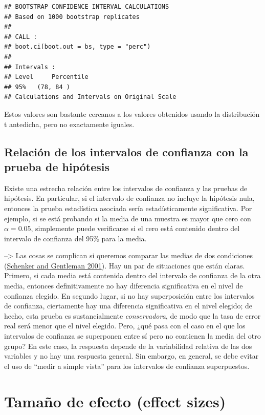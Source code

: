 \documentclass[
  12pt,
]{book}
\begin{document}
\begin{verbatim}
## BOOTSTRAP CONFIDENCE INTERVAL CALCULATIONS
## Based on 1000 bootstrap replicates
## 
## CALL : 
## boot.ci(boot.out = bs, type = "perc")
## 
## Intervals : 
## Level     Percentile     
## 95%   (78, 84 )  
## Calculations and Intervals on Original Scale
\end{verbatim}

Estos valores son bastante cercanos a los valores obtenidos usando la distribución t antedicha, pero no exactamente iguales.

\hypertarget{relaciuxf3n-de-los-intervalos-de-confianza-con-la-prueba-de-hipuxf3tesis}{%
\subsection{Relación de los intervalos de confianza con la prueba de hipótesis}\label{relaciuxf3n-de-los-intervalos-de-confianza-con-la-prueba-de-hipuxf3tesis}}

Existe una estrecha relación entre los intervalos de confianza y las pruebas de hipótesis. En particular, si el intervalo de confianza no incluye la hipótesis nula, entonces la prueba estadística asociada sería estadísticamente significativa. Por ejemplo, si se está probando si la media de una muestra es mayor que cero con \(\alpha = 0.05\), simplemente puede verificarse si el cero está contenido dentro del intervalo de confianza del 95\% para la media.

--\textgreater{}
Las cosas se complican si queremos comparar las medias de dos condiciones (\protect\hyperlink{ref-sche:gent:2001}{Schenker and Gentleman 2001}). Hay un par de situaciones que están claras. Primero, si cada media está contenida dentro del intervalo de confianza de la otra media, entonces definitivamente no hay diferencia significativa en el nivel de confianza elegido. En segundo lugar, si no hay superposición entre los intervalos de confianza, ciertamente hay una diferencia significativa en el nivel elegido; de hecho, esta prueba es sustancialmente \emph{conservadora}, de modo que la tasa de error real será menor que el nivel elegido. Pero, ¿qué pasa con el caso en el que los intervalos de confianza se superponen entre sí pero no contienen la media del otro grupo? En este caso, la respuesta depende de la variabilidad relativa de las dos variables y no hay una respuesta general. Sin embargo, en general, se debe evitar el uso de ``medir a simple vista'' para los intervalos de confianza superpuestos.

\hypertarget{tamauxf1o-de-efecto-effect-sizes}{%
\section{Tamaño de efecto (effect sizes)}\label{tamauxf1o-de-efecto-effect-sizes}}
\end{document}
